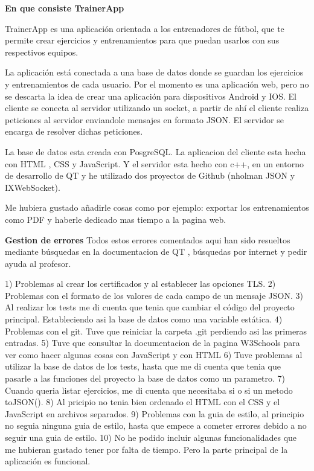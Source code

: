 



{\bfseries En que consiste Trainer\+App}

Trainer\+App es una aplicación orientada a los entrenadores de fútbol, que te permite crear ejercicios y entrenamientos para que puedan usarlos con sus respectivos equipos.

La aplicación está conectada a una base de datos donde se guardan los ejercicios y entrenamientos de cada usuario. Por el momento es una aplicación web, pero no se descarta la idea de crear una aplicación para dispositivos Android y I\+OS. El cliente se conecta al servidor utilizando un socket, a partir de ahí el cliente realiza peticiones al servidor enviandole mensajes en formato J\+S\+ON. El servidor se encarga de resolver dichas peticiones.

La base de datos esta creada con Posgre\+S\+QL. La aplicacion del cliente esta hecha con H\+T\+ML , C\+SS y Java\+Script. Y el servidor esta hecho con c++, en un entorno de desarrollo de QT y he utilizado dos proyectos de Github (nholman J\+S\+ON y I\+X\+Web\+Socket).

Me hubiera gustado añadirle cosas como por ejemplo\+: exportar los entrenamientos como P\+DF y haberle dedicado mas tiempo a la pagina web.

{\bfseries Gestion de errores} Todos estos errores comentados aqui han sido resueltos mediante búsquedas en la documentacion de QT , búsquedas por internet y pedir ayuda al profesor.

1) Problemas al crear los certificados y al establecer las opciones T\+LS. 2) Problemas con el formato de los valores de cada campo de un mensaje J\+S\+ON. 3) Al realizar los tests me di cuenta que tenia que cambiar el código del proyecto principal. Estableciendo asi la base de datos como una variable estática. 4) Problemas con el git. Tuve que reiniciar la carpeta .git perdiendo asi las primeras entradas. 5) Tuve que consultar la documentacion de la pagina W3\+Schools para ver como hacer algunas cosas con Java\+Script y con H\+T\+ML 6) Tuve problemas al utilizar la base de datos de los tests, hasta que me di cuenta que tenia que pasarle a las funciones del proyecto la base de datos como un parametro. 7) Cuando queria listar ejercicios, me di cuenta que necesitaba si o si un metodo to\+J\+S\+O\+N(). 8) Al pricipio no tenia bien ordenado el H\+T\+ML con el C\+SS y el Java\+Script en archivos separados. 9) Problemas con la guia de estilo, al principio no seguia ninguna guia de estilo, hasta que empece a cometer errores debido a no seguir una guia de estilo. 10) No he podido incluir algunas funcionalidades que me hubieran gustado tener por falta de tiempo. Pero la parte principal de la aplicación es funcional.



 